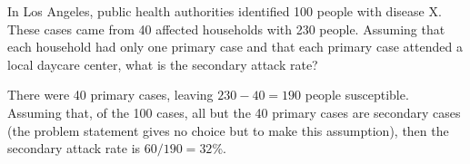 In Los Angeles, public health authorities identified 100 people with disease X.  These cases came from 40 affected households with 230 people.  Assuming that each household had only one primary case and that each primary case attended a local daycare center, what is the secondary attack rate?
\begin{MultipleChoice}[itemname=II-10]
\end{MultipleChoice}

\begin{AnswerText}
There were 40 primary cases, leaving $230 - 40 = 190$ people
susceptible.  Assuming that, of the 100 cases, all but the 40 primary
cases are secondary cases (the problem statement gives no choice but
to make this assumption), then the secondary attack rate is $60/190 = 32$\%.
\end{AnswerText}